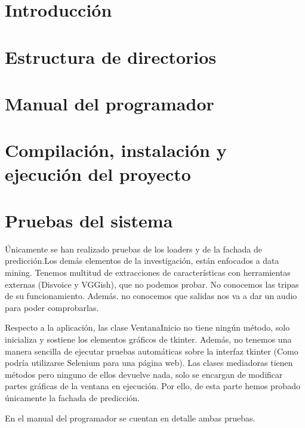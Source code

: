 \section{Introducción}

\section{Estructura de directorios}

\section{Manual del programador}\label{sec:manualprog}

\section{Compilación, instalación y ejecución del proyecto}

\section{Pruebas del sistema}
Únicamente se han realizado pruebas de los loaders y de la fachada de predicción.Los demás elementos de la investigación, están enfocados a data mining. Tenemos multitud de extracciones de características con herramientas externas (Disvoice y VGGish), que no podemos probar. No conocemos las tripas de su funcionamiento. Además. no conocemos que salidas nos va a dar un audio para poder comprobarlas.

Respecto a la aplicación, las clase VentanaInicio no tiene ningún método, solo inicializa y sostiene los elementos gráficos de tkinter. Además, no tenemos una manera sencilla de ejecutar pruebas automáticas sobre la interfaz tkinter (Como podría utilizarse Selenium para una página web). Las clases mediadoras tienen métodos pero ninguno de ellos devuelve nada, solo se encargan de modificar partes gráficas de la ventana en ejecución. Por ello, de esta parte hemos probado únicamente la fachada de predicción.

En el manual del programador se cuentan en detalle ambas pruebas.
